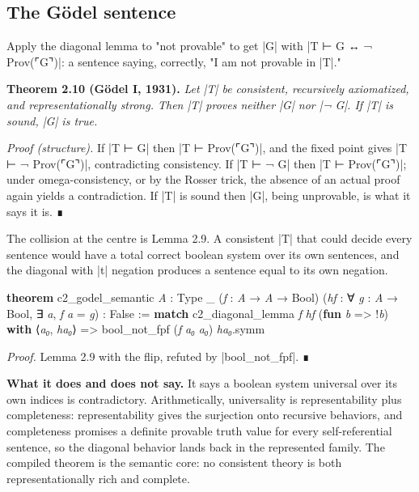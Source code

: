 \documentclass{memoir}
\begin{document}
\subsection{The Gödel sentence}\label{Two--Schemas--of--Impossibility-005F-005F-005F--Machine--Checked--Limits--of--Trustworthy--Machine--Learning-005F-005F-005F--and--Why--They--Tighten--with--Capability----The--Classical--Limits----G-005F-005F-005Fdel-005F-005F-005Fs--first--incompleteness--theorem----The--G-005F-005F-005Fdel--sentence}

Apply the diagonal lemma to "not provable" to get \LeanVerb|G| with \LeanVerb|T ⊢ G ↔ ¬ Prov(⌜G⌝)|:
a sentence saying, correctly, "I am not provable in \LeanVerb|T|."

\textbf{Theorem 2.10 (Gödel I, 1931).} \emph{Let \LeanVerb|T| be consistent, recursively axiomatized,
and representationally strong. Then \LeanVerb|T| proves neither \LeanVerb|G| nor \LeanVerb|¬ G|. If \LeanVerb|T| is
sound, \LeanVerb|G| is true.}

\emph{Proof (structure).} If \LeanVerb|T ⊢ G| then \LeanVerb|T ⊢ Prov(⌜G⌝)|, and the fixed point gives
\LeanVerb|T ⊢ ¬ Prov(⌜G⌝)|, contradicting consistency. If \LeanVerb|T ⊢ ¬ G| then \LeanVerb|T ⊢ Prov(⌜G⌝)|;
under omega-consistency, or by the Rosser trick, the absence of an actual proof
again yields a contradiction. If \LeanVerb|T| is sound then \LeanVerb|G|, being unprovable, is
what it says it is. ∎

The collision at the centre is Lemma 2.9. A consistent \LeanVerb|T| that could decide
every sentence would have a total correct boolean system over its own sentences,
and the diagonal with \LeanVerb|t| negation produces a sentence equal to its own
negation.

\begin{LeanVerbatim}
\textbf{theorem} c2_godel_semantic \textit{A} : Type _ (\textit{f} : \textit{A} → \textit{A} → Bool)
    (\textit{hf} : ∀ \textit{g} : \textit{A} → Bool, ∃ \textit{a}, \textit{f} \textit{a} = \textit{g}) : False :=
  \textbf{match} c2_diagonal_lemma \textit{f} \textit{hf} (\textbf{fun} \textit{b} => !\textit{b}) \textbf{with}
   ⟨\textit{a₀}, \textit{ha₀}⟩ => bool_not_fpf (\textit{f} \textit{a₀} \textit{a₀}) \textit{ha₀}.symm

\end{LeanVerbatim}


\emph{Proof.} Lemma 2.9 with the flip, refuted by \LeanVerb|bool_not_fpf|. ∎

\textbf{What it does and does not say.} It says a boolean system universal over its own
indices is contradictory. Arithmetically, universality is representability plus
completeness: representability gives the surjection onto recursive behaviors,
and completeness promises a definite provable truth value for every
self-referential sentence, so the diagonal behavior lands back in the
represented family. The compiled theorem is the semantic core: no consistent
theory is both representationally rich and complete.
\end{document}

